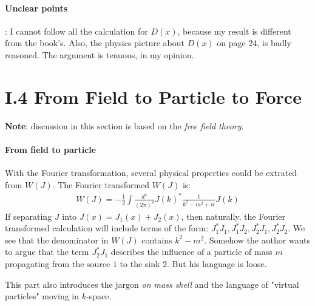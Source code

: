 \documentclass{book}
\numberwithin{equation}{subsection} %
\theoremstyle{definition}
\begin{document}
\paragraph{Unclear points}: I cannot follow all the calculation for 
$D(x)$, because my result is different from the book's. Also, the
physics picture about $D(x)$ on page 24, is badly reasoned. The
argument is tenuous, in my opinion.

\section{I.4 From Field to Particle to Force}
\label{sec:I.4 From Field to Particle to Force}

\textbf{Note}: discussion in this section is based on the \textit{free
field theory}.

\paragraph{From field to particle}

With the Fourier transformation, several physical properties
could be extrated from $W(J)$. The Fourier transformed $W(J)$
 is:
\begin{align}
    W(J) = -\frac{1}{2}\int \frac{d^4}{(2\pi)^4}J(k)^*
        \frac{1}{k^2-m^2+i\epsilon}J(k)
\end{align}
If separating $J$ into $J(x)=J_1(x)+J_2(x)$, then naturally, the
Fourier transformed calculation will include terms of the form:
$J^*_1J_1,J^*_1J_2,J^*_2J_1,J^*_2J_2$. We see that the denominator
in $W(J)$ contains $k^2-m^2$. Somehow the author wants to argue that
the term $J^*_2J_1$ describes the influence of a particle of mass $m$
propagating from the source $1$ to the sink $2$. But his language is loose.

This part also introduces the jargon \textit{on mass shell} and the
language of "virtual particles" moving in $k$-space.
\end{document}
